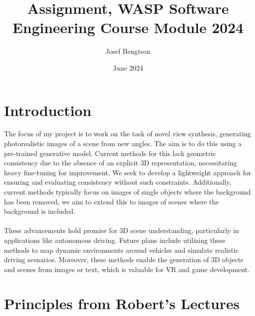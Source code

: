 \documentclass[11pt]{article}
\title{Assignment, WASP Software Engineering Course Module 2024}
\author{Josef Bengtson}
\date{June 2024}
\begin{document}
\maketitle
\newpage
\section{Introduction}

The focus of my project is to work on the task of novel view synthesis, generating photorealistic images of a scene from new angles. The aim is to do this using a pre-trained generative model. Current methods for this lack geometric consistency due to the absence of an explicit 3D representation, necessitating heavy fine-tuning for improvement. We seek to develop a lightweight approach for ensuring and evaluating consistency without such constraints. Additionally, current methods typically focus on images of single objects where the background has been removed, we aim to extend this to images  of scenes where the background is included. 
\\ \\
These advancements hold promise for 3D scene understanding, particularly in applications like autonomous driving. Future plans include utilizing these methods to map dynamic environments around vehicles and simulate realistic driving scenarios. Moreover, these methods enable the generation of 3D objects and scenes from images or text, which is valuable for VR and game development.

\section{Principles
from Robert's Lectures}
\end{document}
